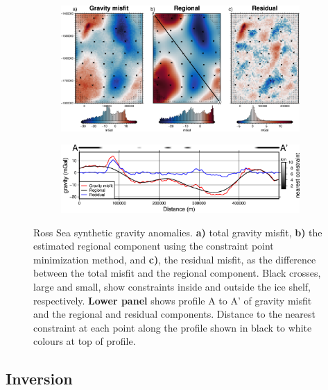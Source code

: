 \begin{figure}[!ht]
  \centering
    \begin{subfigure}[t]{.95\textwidth}
        \centering
        \includegraphics[width=\textwidth]{figures/chp3/chp3_Ross_Sea_misfit.png}
    \end{subfigure}
    \begin{subfigure}[t]{.95\textwidth}
        \centering
        \includegraphics[width=\textwidth]{figures/chp3/chp3_Ross_Sea_misfit_profile.png}
    \end{subfigure}
  \caption[Ross Sea synthetic gravity anomalies]{Ross Sea synthetic gravity anomalies. \textbf{a)} total gravity misfit, \textbf{b)} the estimated regional component using the constraint point minimization method, and \textbf{c)}, the residual misfit, as the difference between the total misfit and the regional component. Black crosses, large and small, show constraints inside and outside the ice shelf, respectively. \textbf{Lower panel} shows profile A to A' of gravity misfit and the regional and residual components. Distance to the nearest constraint at each point along the profile shown in black to white colours at top of profile.}
    \label{fig:chp3_Ross_Sea_misfit}
\end{figure}



\subsection{Inversion}

